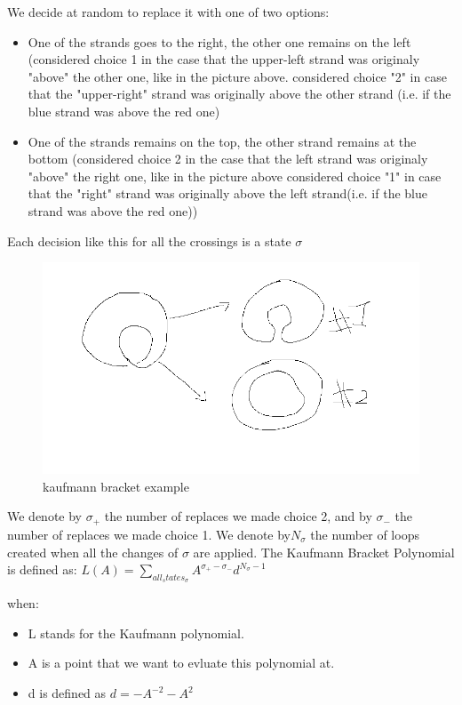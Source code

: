 \documentclass{article}
\begin{document}
We decide at random to replace it with one of two options:
\begin{itemize}
\item One of the strands goes to the right, the other one remains on the left (considered choice 1 in the case that the upper-left strand was originaly "above" the other one, like in the picture above. considered choice "2" in case that the "upper-right" strand was originally above the other strand (i.e. if the blue strand was above the red one)
\item One of the strands remains on the top, the other strand remains at the bottom (considered choice 2 in the case that the left strand was originaly "above" the right one,  like in the picture above considered choice "1" in case that the "right" strand was originally above the left strand(i.e. if the blue strand was above the red one))
\end{itemize}
Each decision like this for all the crossings is a state \(\sigma\)

\begin{figure}
\includegraphics[scale=0.2]{kauffman_calc} 
\caption{kaufmann bracket example}
\end{figure}

We denote by \(\sigma_{+}\) the number of replaces we made choice 2, and by 
\(\sigma_{-}\) the number of replaces we made choice 1.
We denote by\(N_{\sigma}\) the number of loops created when all the changes of \(\sigma\) are applied.
The Kaufmann Bracket Polynomial is defined as:
\( L(A) = \sum\limits_{all_states_\sigma}{A^{\sigma_{+} -\sigma_{-}}d^{N_{\sigma} - 1}}\)

when:
\begin{itemize}
\item L stands for the Kaufmann polynomial.
\item A is a point that we want to evluate this polynomial at.
\item d is defined as \(d = -A^{-2} -A^2\) 
\end{itemize}
\end{document}
